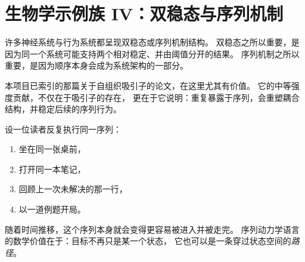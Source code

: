 \section{生物学示例族 IV：双稳态与序列机制}

许多神经系统与行为系统都呈现双稳态或序列机制结构。
双稳态之所以重要，是因为同一个系统可能支持两个相对稳定、并由阈值分开的结果。
序列机制之所以重要，是因为顺序本身会成为系统架构的一部分。

本项目已索引的那篇关于自组织吸引子的论文，在这里尤其有价值。
它的中等强度贡献，不仅在于吸引子的存在，
更在于它说明：重复暴露于序列，会重塑耦合结构，并稳定后续的序列行为。

\begin{example}[把学习序列看作被学会的转变图]
设一位读者反复执行同一序列：
\begin{enumerate}[nosep]
  \item 坐在同一张桌前，
  \item 打开同一本笔记，
  \item 回顾上一次未解决的那一行，
  \item 以一道例题开局。
\end{enumerate}
随着时间推移，这个序列本身就会变得更容易被进入并被走完。
序列动力学语言的数学价值在于：目标不再只是某一个状态，
它也可以是一条穿过状态空间的\emph{路径}。
\end{example}
